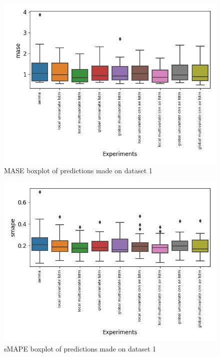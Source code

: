 \begin{figure}[h!]
  \centering
  \includegraphics[width=\textwidth]{./figs/results/boxplot/mase-dataset_1.png}
  \hfill
  \caption{MASE boxplot of predictions made on dataset 1}
  \label{fig:results:boxplot-mase-dataset-1-mase}
\end{figure}
\begin{figure}[h!]
  \centering
  \includegraphics[width=\textwidth]{./figs/results/boxplot/smape-dataset_1.png}
  \hfill
  \caption{sMAPE boxplot of predictions made on dataset 1}
  \label{fig:results:boxplot-mase-dataset-1-smape}
\end{figure}

